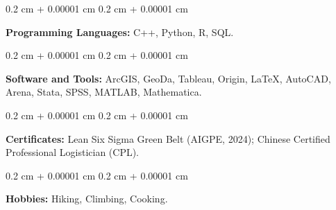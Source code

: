 \documentclass[10pt, letterpaper]{article}
\newenvironment{onecolentry}{
    \begin{adjustwidth}{
        0.2 cm + 0.00001 cm
    }{
        0.2 cm + 0.00001 cm
    }
}{
    \end{adjustwidth}
} %
\begin{document}
\vspace{0.10 cm}

\begin{onecolentry}
    \textbf{Programming Languages:} C++, Python, R, SQL.
\end{onecolentry}

\vspace{0.10 cm}

\begin{onecolentry}
    \textbf{Software and Tools:} ArcGIS, GeoDa, Tableau, Origin, LaTeX, AutoCAD, Arena, Stata, SPSS, MATLAB, Mathematica.
\end{onecolentry}

\vspace{0.10 cm}

\begin{onecolentry}
    \textbf{Certificates:} Lean Six Sigma Green Belt (AIGPE, 2024); Chinese Certified Professional Logistician (CPL).
\end{onecolentry}

\vspace{0.10 cm}

\begin{onecolentry}
    \textbf{Hobbies:} Hiking, Climbing, Cooking.
\end{onecolentry}
        


           
        
    
\end{document}
